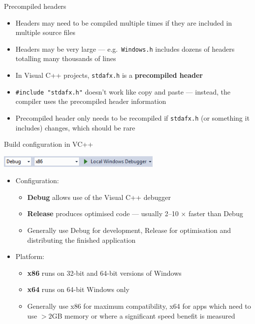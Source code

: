 \begin{frame}[fragile]{Precompiled headers}
    \begin{itemize}
        \item Headers may need to be compiled multiple times if they are included in multiple source files \pause
        \item Headers may be very large ---
            e.g.\ \texttt{Windows.h} includes dozens of headers totalling many thousands of lines \pause
        \item In Visual C++ projects, \texttt{stdafx.h} is a \textbf{precompiled header} \pause
        \item \lstinline{#include "stdafx.h"} doesn't work like copy and paste ---
            instead, the compiler uses the precompiled header information \pause
        \item Precompiled header only needs to be recompiled if \texttt{stdafx.h} (or something it includes)
            changes, which should be rare
    \end{itemize}
\end{frame}

\begin{frame}[fragile]{Build configuration in VC++}
    \begin{center}
        \includegraphics[width=0.6\textwidth]{vcpp_build_toolbar.PNG}
    \end{center}
     \pause
    \begin{itemize}
        \item Configuration:
        \begin{itemize}
            \item \textbf{Debug} allows use of the Visual C++ debugger \pause
            \item \textbf{Release} produces optimised code --- usually 2--10 $\times$ faster than Debug \pause
            \item Generally use Debug for development, Release for optimisation and distributing the finished application \pause
        \end{itemize}
        \item Platform:
        \begin{itemize}
            \item \textbf{x86} runs on 32-bit and 64-bit versions of Windows \pause
            \item \textbf{x64} runs on 64-bit Windows only \pause
            \item Generally use x86 for maximum compatibility, x64 for apps which need to use $>2$GB memory
                or where a significant speed benefit is measured
        \end{itemize}
    \end{itemize}
\end{frame}
